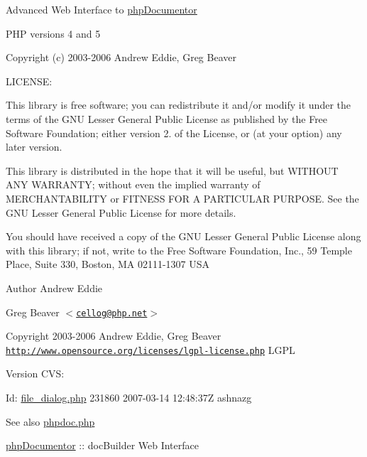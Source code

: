 \-Advanced \-Web \-Interface to \hyperlink{namespacephp_documentor}{php\-Documentor}

\-P\-H\-P versions 4 and 5

\-Copyright (c) 2003-\/2006 \-Andrew \-Eddie, \-Greg \-Beaver

\-L\-I\-C\-E\-N\-S\-E\-:

\-This library is free software; you can redistribute it and/or modify it under the terms of the \-G\-N\-U \-Lesser \-General \-Public \-License as published by the \-Free \-Software \-Foundation; either version 2. of the \-License, or (at your option) any later version.

\-This library is distributed in the hope that it will be useful, but \-W\-I\-T\-H\-O\-U\-T \-A\-N\-Y \-W\-A\-R\-R\-A\-N\-T\-Y; without even the implied warranty of \-M\-E\-R\-C\-H\-A\-N\-T\-A\-B\-I\-L\-I\-T\-Y or \-F\-I\-T\-N\-E\-S\-S \-F\-O\-R \-A \-P\-A\-R\-T\-I\-C\-U\-L\-A\-R \-P\-U\-R\-P\-O\-S\-E. \-See the \-G\-N\-U \-Lesser \-General \-Public \-License for more details.

\-You should have received a copy of the \-G\-N\-U \-Lesser \-General \-Public \-License along with this library; if not, write to the \-Free \-Software \-Foundation, \-Inc., 59 \-Temple \-Place, \-Suite 330, \-Boston, \-M\-A 02111-\/1307 \-U\-S\-A

\begin{DoxyAuthor}{\-Author}
\-Andrew \-Eddie 

\-Greg \-Beaver $<$\href{mailto:cellog@php.net}{\tt cellog@php.\-net}$>$ 
\end{DoxyAuthor}
\begin{DoxyCopyright}{\-Copyright}
2003-\/2006 \-Andrew \-Eddie, \-Greg \-Beaver  \href{http://www.opensource.org/licenses/lgpl-license.php}{\tt http\-://www.\-opensource.\-org/licenses/lgpl-\/license.\-php} \-L\-G\-P\-L 
\end{DoxyCopyright}
\begin{DoxyVersion}{\-Version}
\-C\-V\-S\-: 
\end{DoxyVersion}
\begin{DoxyParagraph}{\-Id\-:}
\hyperlink{file__dialog_8php}{file\-\_\-dialog.\-php} 231860 2007-\/03-\/14 12\-:48\-:37\-Z ashnazg 
\end{DoxyParagraph}
\begin{DoxySeeAlso}{\-See also}
\hyperlink{phpdoc_8php}{phpdoc.\-php}
\end{DoxySeeAlso}
\hyperlink{namespacephp_documentor}{php\-Documentor} \-:\-: doc\-Builder \-Web \-Interface

